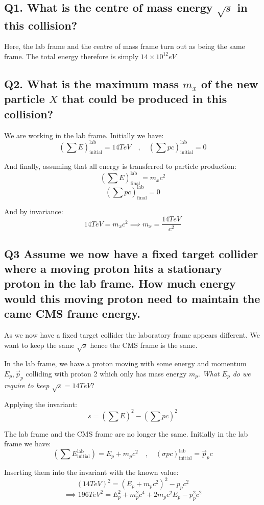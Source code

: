 \subsection{Q1. What is the centre of mass energy $\sqrt{s}$ in this collision?}
Here, the lab frame and the centre of mass frame turn out as being the same frame. The total energy therefore is simply $14 \times 10^12 \si{eV}$

\subsection{Q2. What is the maximum mass $m_x$ of the new particle $X$ that could be produced in this collision?}
We are working in the lab frame. Initially we have:
\[
    \left(\sum E\right)^\text{lab}_\text{initial} = 14 \si{TeV} \quad , \quad \left(\sum pc\right)^\text{lab}_\text{initial} = 0
\]

And finally, assuming that all energy is transferred to particle production:
\[
    \left(\sum E\right)^\text{lab}_\text{final} = m_x c^2
\]
\[
    \left(\sum pc\right)^\text{lab}_\text{final} = 0
\]

And by invariance:
\[
    14 \si{TeV} = m_x c^2 \implies m_x = \frac{14 \si{TeV}}{c^2}
\]

\subsection{Q3 Assume we now have a fixed target collider where a moving proton hits a stationary proton in the lab frame. How much energy would this moving proton need to maintain the came CMS frame energy.}

As we now have a fixed target collider the laboratory frame appears different. We want to keep the same $\sqrt{s}$ hence the CMS frame is the same.

In the lab frame, we have a proton moving with some energy and momentum $E_p, \vec{p}_p$ colliding with proton 2 which only has mass energy $m_p$. \emph{What $E_p$ do we require to keep $\sqrt{s} = 14 \si{TeV}$}?

Applying the invariant:
\[
    s = \left(\sum E\right)^2 - \left(\sum pc\right)^2
\]

The lab frame and the CMS frame are no longer the same. Initially in the lab frame we have:
\[
    \left(\sum E_\text{initial}^\text{lab}\right) = E_p + m_p c^2 \quad,\quad \left(\sigma pc\right)^\text{lab}_\text{initial} = \vec{p}_p c
\]

Inserting them into the invariant with the known value:
\[
    \left(14 \si{TeV}\right)^2 = (E_p + m_p c^2)^2 - p_p c^2
\]
\[
    \implies 196 \si{TeV^2} = E_p^2 + m_p^2 c^4 + 2 m_pc^2E_p - p_p^2 c^2
\]


